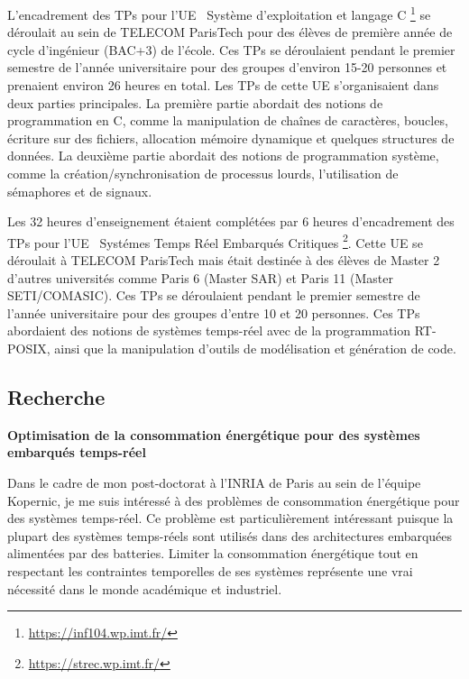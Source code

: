 \documentclass{article}
\begin{document}
L'encadrement des TPs pour l'UE \guillemotleft\ 
Système d'exploitation et langage C 
\guillemotright\footnote{\url{https://inf104.wp.imt.fr/}} se déroulait au sein de TELECOM ParisTech pour 
des 
élèves de première année de cycle d'ingénieur (BAC+3) de l'école. Ces TPs se déroulaient pendant le 
premier semestre de l'année universitaire pour des groupes d'environ 15-20 personnes et prenaient environ 
26 heures en total. Les TPs de cette UE s'organisaient dans deux parties principales. La première partie 
abordait des notions de programmation en C, comme la manipulation de chaînes de caractères, 
boucles, écriture sur des fichiers, allocation mémoire dynamique et quelques structures de données. La 
deuxième partie abordait des notions de programmation système, comme la création/synchronisation de 
processus lourds, l'utilisation de sémaphores et de signaux.
\vspace{.5cm}

Les 32 heures d'enseignement étaient complétées par 6 heures d'encadrement des TPs pour l'UE 
\guillemotleft\ Systémes Temps Réel Embarqués Critiques 
\guillemotright\footnote{\url{https://strec.wp.imt.fr/}}. Cette UE se déroulait à TELECOM ParisTech mais 
était destinée à des élèves de Master 2 d'autres universités comme Paris 6 (Master SAR) et Paris 11 (Master 
SETI/COMASIC). Ces TPs se déroulaient pendant le premier semestre de l'année universitaire pour des 
groupes d'entre 10 et 20 personnes. Ces TPs abordaient des notions de systèmes temps-réel avec de la 
programmation RT-POSIX, ainsi que la manipulation d'outils de modélisation et génération de code.

\subsection{Recherche}

\textbf{Optimisation de la consommation énergétique pour des systèmes embarqués temps-réel}

Dans le cadre de mon post-doctorat à l'INRIA de Paris au sein de l'équipe Kopernic, je me suis intéressé à 
des problèmes de consommation énergétique pour des systèmes temps-réel. Ce problème est 
particulièrement intéressant puisque la plupart des systèmes temps-réels sont utilisés dans des 
architectures embarquées alimentées par des batteries. Limiter la consommation énergétique tout en 
respectant les contraintes temporelles de ses systèmes représente une vrai nécessité dans le monde 
académique et industriel.
\end{document}
